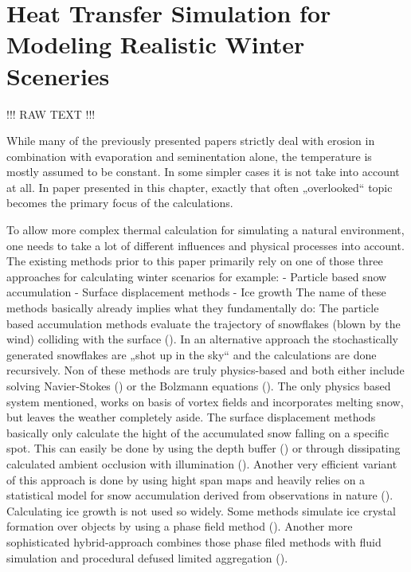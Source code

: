 \section{Heat Transfer Simulation for Modeling Realistic Winter Sceneries}

\cite{benes2001layered}
!!! RAW TEXT !!!

While many of the previously presented papers strictly deal with erosion in combination with evaporation and seminentation alone, the temperature is mostly assumed to be constant. In some simpler cases it is not take into account at all. In paper presented in this chapter, exactly that often „overlooked“ topic becomes the primary focus of the calculations.

To allow more complex thermal calculation for simulating a natural environment, one needs to take a lot of different influences and physical processes into account. The existing methods prior to this paper primarily rely on one of those three approaches for calculating winter scenarios for example:
- Particle based snow accumulation
- Surface displacement methods
- Ice growth
The name of these methods basically already implies what they fundamentally do:
The particle based accumulation methods evaluate the trajectory of snowflakes (blown by the wind) colliding with the surface (). In an alternative approach the stochastically generated snowflakes are „shot up in the sky“ and the calculations are done recursively. Non of these methods are truly physics-based and both either include solving Navier-Stokes () or the Bolzmann equations (). The only physics based system mentioned, works on basis of vortex fields and incorporates melting snow, but leaves the weather completely aside.
The surface displacement methods basically only calculate the hight of the accumulated snow falling on a specific spot. This can easily be done by using the depth buffer () or through dissipating calculated ambient occlusion with illumination (). Another very efficient variant of this approach is done by using hight span maps and heavily relies on a statistical model for snow accumulation derived from observations in nature ().
Calculating ice growth is not used so widely. Some methods simulate ice crystal formation over objects by using a phase field method (). Another more sophisticated hybrid-approach combines those phase filed methods with fluid simulation and procedural defused limited aggregation ().

